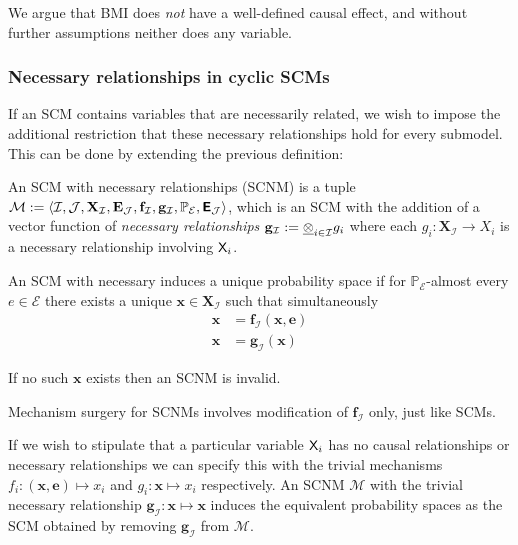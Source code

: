 We argue that BMI does \emph{not} have a well-defined causal effect, and without further assumptions neither does any variable.


\subsubsection{Necessary relationships in cyclic SCMs}

If an SCM contains variables that are necessarily related, we wish to impose the additional restriction that these necessary relationships hold for every submodel. This can be done by extending the previous definition:

\begin{definition}
An SCM with necessary relationships (SCNM) is a tuple $\mathcal{M}:=\langle \mathcal{I},\mathcal{J},\mathbf{X}_{\mathcal{I}},\mathbf{E}_{\mathcal{J}},\mathbf{f}_{\mathcal{I}},\mathbf{g}_{\mathcal{I}},\mathbb{P}_{\mathcal{E}},\bm{\mathsf{E}}_{\mathcal{J}}\rangle$, which is an SCM with the addition of a vector function of \emph{necessary relationships} $\mathbf{g}_{\mathcal{I}}:=\underline{\otimes}_{i\in\mathcal{I}} g_i$ where each $g_i:\mathbf{X}_{\mathcal{I}}\to X_i$ is a necessary relationship involving $\mathsf{X}_i$.

An SCM with necessary induces a unique probability space if for $\mathbb{P}_{\mathcal{E}}$-almost every $e\in\mathcal{E}$ there exists a unique $\mathbf{x}\in\mathbf{X}_{\mathcal{I}}$ such that simultaneously
\begin{align}
	\mathbf{x} &= \mathbf{f}_{\mathcal{I}}(\mathbf{x},\mathbf{e})\\
	\mathbf{x} &= \mathbf{g}_{\mathcal{I}}(\mathbf{x})
\end{align}

If no such $\mathbf{x}$ exists then an SCNM is invalid.

Mechanism surgery for SCNMs involves modification of $\mathbf{f}_{\mathcal{I}}$ only, just like SCMs.

If we wish to stipulate that a particular variable $\mathsf{X}_i$ has no causal relationships or necessary relationships we can specify this with the trivial mechanisms $f_i:(\mathbf{x},\mathbf{e})\mapsto x_i$ and $g_i:\mathbf{x} \mapsto x_i$ respectively. An SCNM $\mathcal{M}$ with the trivial necessary relationship $\mathbf{g}_{\mathcal{I}}: \mathbf{x}\mapsto \mathbf{x}$ induces the equivalent probability spaces as the SCM obtained by removing $\mathbf{g}_{\mathcal{I}}$ from $\mathcal{M}$.
\end{definition}

